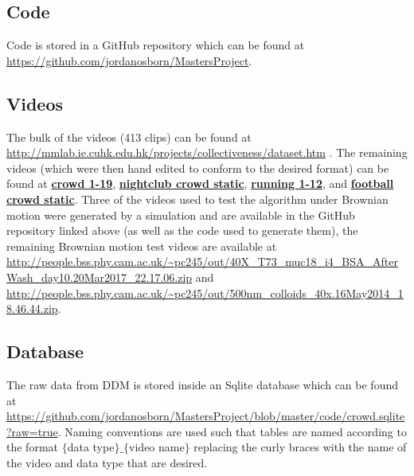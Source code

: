 \documentclass[11pt]{article}
\let\oldhref\href
\renewcommand{\href}[2]{\oldhref{#1}{\bfseries#2}}
\begin{document}
\subsection{Code}
Code is stored in a GitHub repository which can be found at \url{https://github.com/jordanosborn/MastersProject}.
\subsection{Videos}
The bulk of the videos (413 clips) can be found at \url{http://mmlab.ie.cuhk.edu.hk/projects/collectiveness/dataset.htm} \cite{crowdMotionDB}. The remaining videos (which were then hand edited to conform to the desired format) can be found at \href{https://www.youtube.com/watch?v=nrST7C_mDT8}{crowd 1-19}, \href{https://www.youtube.com/watch?v=lpEF1uyCH44}{nightclub crowd static},  \href{https://www.youtube.com/watch?v=sj2er0LPlH0}{running 1-12}, and \href{https://www.youtube.com/watch?v=AQdZ2OTF7VA}{football crowd static}. Three of the videos used to test the algorithm under Brownian motion were generated by a simulation and are available in the GitHub repository linked above (as well as the code used to generate them), the remaining Brownian motion test videos are available at \url{http://people.bss.phy.cam.ac.uk/~pc245/out/40X_T73_muc18_i4_BSA_AfterWash_day10.20Mar2017_22.17.06.zip} and \url{http://people.bss.phy.cam.ac.uk/~pc245/out/500nm_colloids_40x.16May2014_18.46.44.zip}.
\subsection{Database}
The raw data from DDM is stored inside an Sqlite database which can be found at \url{https://github.com/jordanosborn/MastersProject/blob/master/code/crowd.sqlite?raw=true}. Naming conventions are used such that tables are named according to the format $\{$data type$\}\_\{$video name$\}$ replacing the curly braces with the name of the video and data type that are desired.
\end{document}
